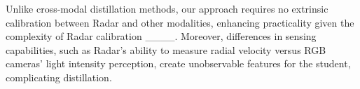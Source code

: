 Unlike cross-modal distillation methods, our approach requires no extrinsic calibration between Radar and other modalities, enhancing practicality given the complexity of Radar calibration ____. Moreover, differences in sensing capabilities, such as Radar's ability to measure radial velocity versus RGB cameras' light intensity perception, create unobservable features for the student, complicating distillation.

